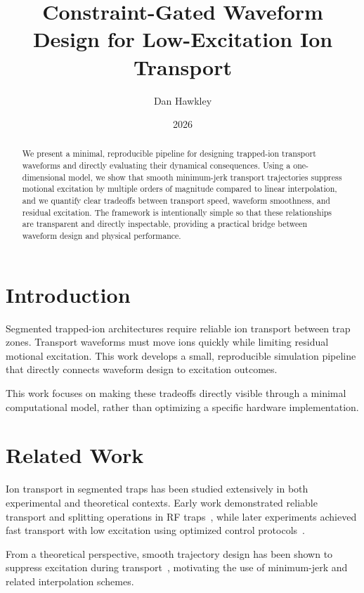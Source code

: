 \documentclass[11pt]{article}
\title{Constraint-Gated Waveform Design for Low-Excitation Ion Transport}
\author{Dan Hawkley}
\date{2026}
\begin{document}
\maketitle

\begin{abstract}
We present a minimal, reproducible pipeline for designing trapped-ion
transport waveforms and directly evaluating their dynamical consequences.
Using a one-dimensional model, we show that smooth minimum-jerk transport
trajectories suppress motional excitation by multiple orders of magnitude
compared to linear interpolation, and we quantify clear tradeoffs between
transport speed, waveform smoothness, and residual excitation. The
framework is intentionally simple so that these relationships are
transparent and directly inspectable, providing a practical bridge
between waveform design and physical performance.
\end{abstract}

\section{Introduction}

Segmented trapped-ion architectures require reliable ion transport between
trap zones. Transport waveforms must move ions quickly while limiting
residual motional excitation. This work develops a small, reproducible
simulation pipeline that directly connects waveform design to excitation
outcomes.

This work focuses on making these tradeoffs directly visible through a
minimal computational model, rather than optimizing a specific hardware
implementation.

\section{Related Work}

Ion transport in segmented traps has been studied extensively in both
experimental and theoretical contexts. Early work demonstrated reliable
transport and splitting operations in RF traps~\cite{rowe2002transport},
while later experiments achieved fast transport with low excitation using
optimized control protocols~\cite{bowler2012coherent}.

From a theoretical perspective, smooth trajectory design has been shown
to suppress excitation during transport~\cite{torrontegui2011fast},
motivating the use of minimum-jerk and related interpolation schemes.
\end{document}
